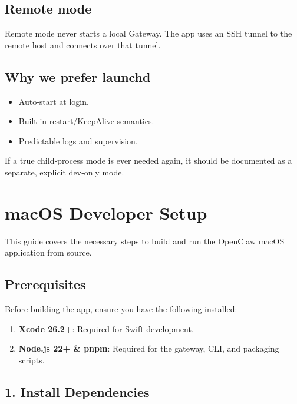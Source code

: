 \subsection{Remote mode}


Remote mode never starts a local Gateway. The app uses an SSH tunnel to the
remote host and connects over that tunnel.

\subsection{Why we prefer launchd}


\begin{itemize}
  \item Auto‑start at login.
  \item Built‑in restart/KeepAlive semantics.
  \item Predictable logs and supervision.
\end{itemize}


If a true child‑process mode is ever needed again, it should be documented as a
separate, explicit dev‑only mode.


\clearpage

\section{macOS Developer Setup}


This guide covers the necessary steps to build and run the OpenClaw macOS application from source.

\subsection{Prerequisites}


Before building the app, ensure you have the following installed:

\begin{enumerate}
  \item \textbf{Xcode 26.2+}: Required for Swift development.
  \item \textbf{Node.js 22+ \& pnpm}: Required for the gateway, CLI, and packaging scripts.
\end{enumerate}


\subsection{1. Install Dependencies}


